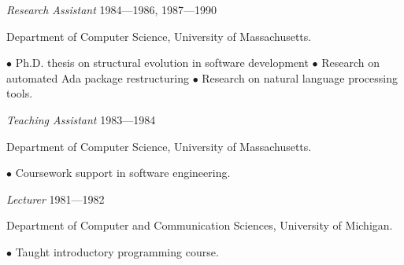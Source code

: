 \begin{Research and Teaching Experience}
  
\item {\em Research Assistant} \hfill   1984---1986, 1987---1990
\vspace*{-10pt}
\item Department of Computer Science,  University of Massachusetts.

 $\bullet$ Ph.D. thesis on structural evolution in software development \newline
 $\bullet$ Research on automated Ada package restructuring \newline
 $\bullet$ Research on natural language processing tools. 
  
\item {\em Teaching Assistant} \hfill  1983---1984
\vspace*{-10pt}
\item Department of Computer Science, University  of Massachusetts.

 $\bullet$ Coursework support in software engineering.
  
\item {\em Lecturer} \hfill  1981---1982
\vspace*{-10pt}
\item Department of Computer and Communication Sciences, University of Michigan.

 $\bullet$ Taught introductory programming course.  

\end{Research and Teaching Experience}

